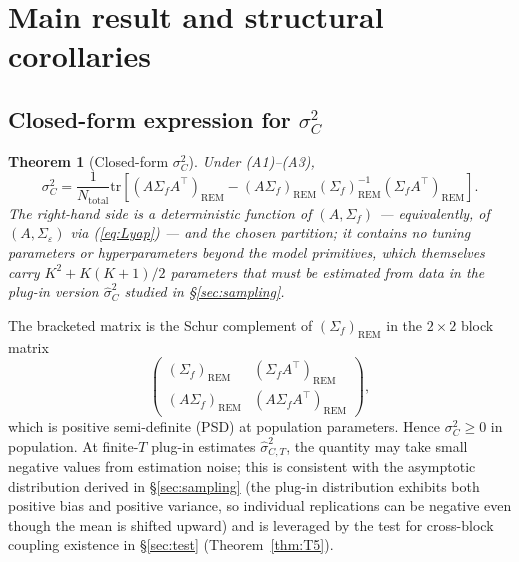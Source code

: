 \documentclass[11pt,letterpaper]{article}
\newtheorem{theorem}{Theorem}
\theoremstyle{remark}
\newcommand{\REM}{\mathrm{REM}}
\newcommand{\Ntot}{N_{\mathrm{total}}}
\newcommand{\hatsigC}{\widehat{\sigma}^2_C}
\newcommand{\trace}{\mathrm{tr}}
\begin{document}
\section{Main result and structural corollaries}\label{sec:main}

\subsection{\texorpdfstring{Closed-form expression for $\sigma^2_C$}{Closed-form expression for sigma\textasciicircum 2\_C}}

\begin{theorem}[Closed-form $\sigma^2_C$]\label{thm:T1}
Under (A1)--(A3),
\begin{equation}\label{eq:T1}
\sigma^2_C = \frac{1}{\Ntot} \trace\!\left[(A \Sigma_f A^\top)_\REM - (A \Sigma_f)_\REM (\Sigma_f)_\REM^{-1} (\Sigma_f A^\top)_\REM\right].
\end{equation}
The right-hand side is a deterministic function of $(A, \Sigma_f)$ --- equivalently, of $(A, \Sigma_\varepsilon)$ via (\ref{eq:Lyap}) --- and the chosen partition; it contains no tuning parameters or hyperparameters beyond the model primitives, which themselves carry $K^2 + K(K+1)/2$ parameters that must be estimated from data in the plug-in version $\hatsigC$ studied in \S\ref{sec:sampling}.
\end{theorem}

The bracketed matrix is the Schur complement of $(\Sigma_f)_\REM$ in the $2 \times 2$ block matrix
\begin{equation*}
\begin{pmatrix} (\Sigma_f)_\REM & (\Sigma_f A^\top)_\REM \\ (A \Sigma_f)_\REM & (A \Sigma_f A^\top)_\REM \end{pmatrix},
\end{equation*}
which is positive semi-definite (PSD) at population parameters. Hence $\sigma^2_C \ge 0$ in population. At finite-$T$ plug-in estimates $\widehat\sigma^2_{C, T}$, the quantity may take small negative values from estimation noise; this is consistent with the asymptotic distribution derived in \S\ref{sec:sampling} (the plug-in distribution exhibits both positive bias and positive variance, so individual replications can be negative even though the mean is shifted upward) and is leveraged by the test for cross-block coupling existence in \S\ref{sec:test} (Theorem~\ref{thm:T5}).
\end{document}
